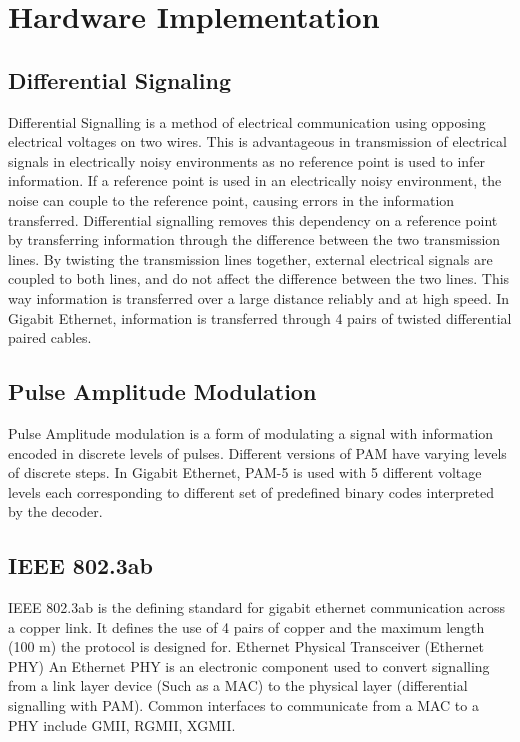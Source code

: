 \section{Hardware Implementation}

\subsection{Differential Signaling}

\par Differential Signalling is a method of electrical communication using opposing electrical voltages on two wires. 
This is advantageous in transmission of electrical signals in electrically noisy environments as no reference 
point is used to infer information. If a reference point is used in an electrically noisy environment, the 
noise can couple to the reference point, causing errors in the information transferred. Differential signalling 
removes this dependency on a reference point by transferring information through the difference between the two 
transmission lines. By twisting the transmission lines together, external electrical signals are coupled to both 
lines, and do not affect the difference between the two lines. This way information is transferred over a large 
distance reliably and at high speed. In Gigabit Ethernet, information is transferred through 4 pairs of twisted 
differential paired cables.

\subsection{Pulse Amplitude Modulation}

\par Pulse Amplitude modulation is a form of modulating a signal with information encoded in discrete levels of pulses.
Different versions of PAM have varying levels of discrete steps. In Gigabit Ethernet, PAM-5 is used with 5 
different voltage levels each corresponding to different set of predefined binary codes interpreted by the 
decoder.

\subsection{IEEE 802.3ab}

\par IEEE 802.3ab is the defining standard for gigabit ethernet communication across a copper link. 
It defines the use of 4 pairs of copper and the maximum length (100 m) the protocol is designed for.
Ethernet Physical Transceiver (Ethernet PHY)
An Ethernet PHY is an electronic component used to convert signalling from a link layer device (Such as a MAC) 
to the physical layer (differential signalling with PAM). Common interfaces to communicate from a MAC to a PHY 
include GMII, RGMII, XGMII.

